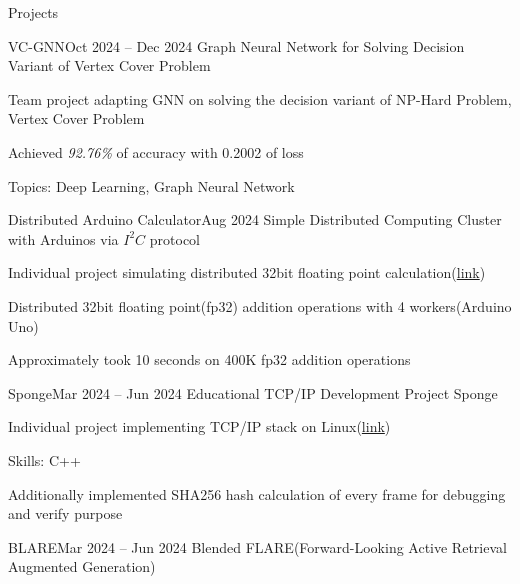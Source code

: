 \documentclass{resume}
\begin{document}
\begin{rSection}{Projects}
    \begin{rSubsection}{VC-GNN}{Oct 2024 -- Dec 2024}
        Graph Neural Network for Solving Decision Variant of Vertex Cover Problem

        \item Team project adapting GNN on solving the decision variant of NP-Hard Problem, Vertex Cover Problem

        \item Achieved \emph{92.76\%} of accuracy with 0.2002 of loss

        \item Topics: Deep Learning, Graph Neural Network
    \end{rSubsection}


    \begin{rSubsection}{Distributed Arduino Calculator}{Aug 2024}
        Simple Distributed Computing Cluster with Arduinos via $I^2C$ protocol

        \item Individual project simulating distributed 32bit floating point calculation(\href{https://github.com/minsusun/kakashi/tree/main/avr/arduino/i2c-distributed-floating-point-calculator}{link})

        \item Distributed 32bit floating point(fp32) addition operations with 4 workers(Arduino Uno)

        \item Approximately took 10 seconds on 400K fp32 addition operations
    \end{rSubsection}

    \begin{rSubsection}{Sponge}{Mar 2024 -- Jun 2024}
        Educational TCP/IP Development Project Sponge

        \item Individual project implementing TCP/IP stack on Linux(\href{https://github.com/minsusun/csed353-sponge}{link})

        \item Skills: C++

        \item Additionally implemented SHA256 hash calculation of every frame for debugging and verify purpose
    \end{rSubsection}

    \begin{rSubsection}{BLARE}{Mar 2024 -- Jun 2024}
        Blended FLARE(Forward-Looking Active Retrieval Augmented Generation)


\end{rSubsection}
\end{rSection}
\end{document}
